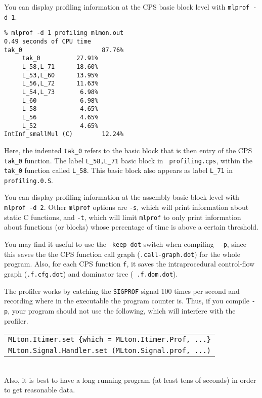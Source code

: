You can display profiling information at the CPS basic block level with
{\tt mlprof -d 1}.

\begin{verbatim}
% mlprof -d 1 profiling mlmon.out
0.49 seconds of CPU time
tak_0                      87.76%
     tak_0          27.91%       
     L_58,L_71      18.60%       
     L_53,L_60      13.95%       
     L_56,L_72      11.63%       
     L_54,L_73       6.98%       
     L_60            6.98%       
     L_58            4.65%       
     L_56            4.65%       
     L_52            4.65%       
IntInf_smallMul (C)        12.24%
\end{verbatim}
Here, the indented {\tt tak\_0} refers to the basic block that is then entry of
the CPS {\tt tak\_0} function.  The label {\tt L\_58,L\_71} basic block in {\tt
profiling.cps}, within the {\tt tak\_0} function called {\tt L\_58}.  This basic
block also appears as label {\tt L\_71} in {\tt profiling.0.S}.

You can display profiling information at the assembly basic block level with
{\tt mlprof -d 2}.  Other {\tt mlprof} options are
{\tt -s}, which will print information about static C functions, and {\tt -t},
which will limit {\tt mlprof} to only print information about functions (or
blocks) whose percentage of time is above a certain threshold.

You may find it useful to use the {\tt -keep dot} switch when compiling {\tt
-p}, since this saves the the CPS function call graph ({\tt .call-graph.dot})
for the whole program.  Also, for each CPS function {\tt f}, it saves the
intraprocedural control-flow graph ({\tt .f.cfg.dot}) and dominator tree ({\tt
.f.dom.dot}).

The profiler works by catching the {\tt SIGPROF} signal 100 times per second and
recording where in the executable the program counter is.  Thus, if you compile
{\tt -p}, your program should not use the following, which will interfere with
the profiler.\\
\begin{tabular}{l}
\tt MLton.Itimer.set \{which = MLton.Itimer.Prof, ...\}\\
\tt MLton.Signal.Handler.set (MLton.Signal.prof, ...)
\end{tabular}\\
Also, it is best to have a long running program (at least tens of seconds) in
order to get reasonable data. 

